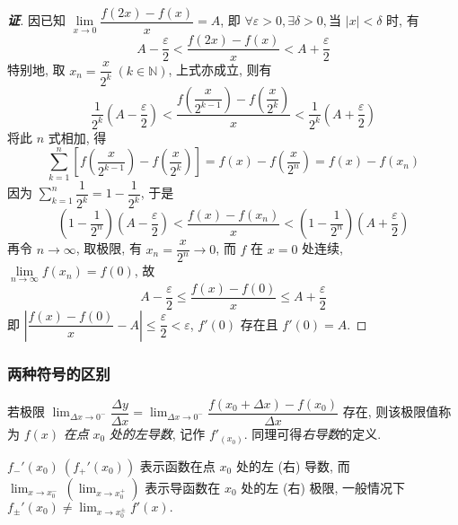 \begin{proof}[{\songti \textbf{证}}]
    因已知 $\lim\limits_{x\to0}\dfrac{f(2x)-f(x)}{x}=A$, 即 $\forall \varepsilon>0,\exists\delta>0,\text{当 }|x|<\delta$ 时, 有
    $$A-\dfrac{\varepsilon }{2} <\dfrac{f(2x) -f(x) }{x} <A+\dfrac{\varepsilon }{2}$$
    特别地, 取 $x_n=\dfrac{x}{2^k}~  (k\in\mathbb{N})$, 上式亦成立, 则有
    $$\dfrac{1}{2^{k}}\left( A-\dfrac{\varepsilon }{2}\right)  <\dfrac{f\left( \dfrac{x}{2^{k-1}}\right) -f\left( \dfrac{x}{2^{k}}\right) }{x} <\dfrac{1}{2^{k}}\left( A+\dfrac{\varepsilon }{2}\right) $$
    将此 $n$ 式相加, 得
    $$\sum ^{n}_{k=1}\left[ f\left( \dfrac{x}{2^{k-1}}\right) -f\left( \dfrac{x}{2^{k}}\right) \right] =f(x) -f\left( \dfrac{x}{2^{n}}\right) =f(x) -f\left( x_{n}\right) $$
    因为 $\displaystyle\sum ^{n}_{k=1}\dfrac{1}{2^{k}}=1-\dfrac{1}{2^{k}}$, 于是
    $$\left( 1-\dfrac{1}{2^{n}}\right) \left( A-\dfrac{\varepsilon }{2}\right)  <\dfrac{f(x) -f\left( x_{n}\right) }{x} <\left( 1-\dfrac{1}{2^{n}}\right) \left( A+\dfrac{\varepsilon }{2}\right) $$
    再令 $n\to\infty$, 取极限, 有 $x_n=\dfrac{x}{2^n}\to0$, 而 $f$ 在 $x=0$ 处连续,  $\lim\limits_{n\to\infty}f(x_n)=f(0)$, 故
    $$A-\dfrac{\varepsilon }{2}\leqslant \dfrac{f(x) -f(0) }{x}\leqslant A+\dfrac{\varepsilon }{2}$$
    即 $\left| \dfrac{f(x) -f(0) }{x}-A\right| \leqslant \dfrac{\varepsilon }{2} <\varepsilon $, $f'(0)$ 存在且 $f'(0)=A.$
\end{proof}

\subsubsection{两种符号的区别}

\begin{definition}[左右导数]
    若极限 $\displaystyle\lim_{\Delta x\to 0^-}\dfrac{\Delta y}{\Delta x}=\lim_{\Delta x\to0^-}\dfrac{f(x_0+\Delta x)-f(x_0)}{\Delta x}$ 存在, 则该极限值称为 $f(x)$ \textit{在点} $x_0$ \textit{处的左导数}, 记作 $f'_(x_0)$.
    同理可得\textit{右导数}的定义.
\end{definition}

$f_-'(x_0)~(f_+'(x_0))$ 表示函数在点 $x_0$ 处的左 (右) 导数, 而 $\displaystyle\lim_{x\to x_0^-}~(\lim_{x\to x_0^+})$ 表示导函数在 $x_0$ 处的左 (右) 极限, 
一般情况下 $f_{\pm}'(x_0)\neq \displaystyle\lim_{x\to x_0^{\pm}}f'(x).$

